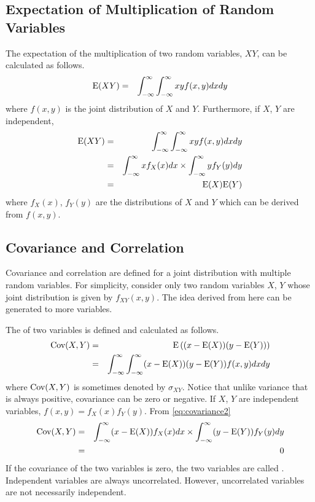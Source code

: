 \subsection{Expectation of Multiplication of Random Variables}

The expectation of the multiplication of two random variables, $XY$, can be calculated as follows.
\begin{eqnarray}
	\textup{E}(XY) &=& \int_{-\infty}^{\infty}\int_{-\infty}^{\infty} xyf(x, y)dxdy \nonumber
\end{eqnarray}
where $f(x, y)$ is the joint distribution of $X$ and $Y$. Furthermore, if $X$, $Y$ are independent,
\begin{eqnarray}
	\textup{E}(XY) &=& \int_{-\infty}^{\infty}\int_{-\infty}^{\infty} xyf(x, y)dxdy \nonumber \\
	&=& \int_{-\infty}^{\infty}xf_X(x)dx \times \int_{-\infty}^{\infty}yf_Y(y)dy \nonumber \\
	&=& \textup{E}(X)\textup{E}(Y) \nonumber
\end{eqnarray}
where $f_X(x)$, $f_Y(y)$ are the distributions of $X$ and $Y$ which can be derived from $f(x,y)$.

\subsection{Covariance and Correlation}

Covariance and correlation are defined for a joint distribution with multiple random variables. For simplicity, consider only two random variables $X$, $Y$ whose joint distribution is given by $f_{XY}(x, y)$. The idea derived from here can be generated to more variables.

The  of two variables is defined and calculated as follows.
\begin{eqnarray}
	\textup{Cov}(X, Y) &=& \textup{E}\left((x - \textup{E}(X))(y - \textup{E}(Y))\right) \label{eq:covariance1} \\
	&=& \int_{-\infty}^{\infty}\int_{-\infty}^{\infty}(x - \textup{E}(X))(y - \textup{E}(Y))f(x, y)dxdy \label{eq:covariance2}
\end{eqnarray}
where $\textup{Cov}(X, Y)$ is sometimes denoted by $\sigma_{XY}$. Notice that unlike variance that is always positive, covariance can be zero or negative. If $X$, $Y$ are independent variables, $f(x,y) = f_X(x)f_Y(y)$. From \eqref{eq:covariance2}
\begin{eqnarray}
	\textup{Cov}(X, Y) &=& \int_{-\infty}^{\infty}(x - \textup{E}(X))f_X(x)dx \times \int_{-\infty}^{\infty}(y - \textup{E}(Y))f_Y(y)dy \nonumber \\
	&=& 0 \nonumber
\end{eqnarray}
If the covariance of the two variables is zero, the two variables are called . Independent variables are always uncorrelated. However, uncorrelated variables are not necessarily independent.

